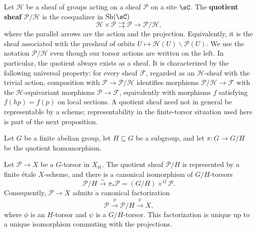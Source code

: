 Let $\mathcal{H}$ be a sheaf of groups acting on a sheaf $\mathcal{P}$ on a
site $\sC$. The \textbf{quotient sheaf} $\mathcal{P}/\mathcal{H}$ is the
coequalizer in $\operatorname{Sh}(\sC)$
\[
\mathcal{H}\times\mathcal{P}
\rightrightarrows
\mathcal{P}\longrightarrow\mathcal{P}/\mathcal{H},
\]
where the parallel arrows are the action and the projection.
Equivalently, it is the sheaf associated with the presheaf of orbits
$U\mapsto\mathcal{H}(U)\backslash\mathcal{P}(U)$. We use the notation
$\mathcal{P}/\mathcal{H}$ even though our torsor actions are written on the
left. In particular, the quotient always exists as a sheaf. It is
characterized by the following universal property:
for every sheaf $\mathcal{F}$, regarded as an $\mathcal{H}$-sheaf with the
trivial action, composition with
$\mathcal{P}\to\mathcal{P}/\mathcal{H}$ identifies morphisms
$\mathcal{P}/\mathcal{H}\to\mathcal{F}$ with the
$\mathcal{H}$-equivariant morphisms $\mathcal{P}\to\mathcal{F}$, equivalently
with morphisms $f$ satisfying $f(hp)=f(p)$ on local sections. A quotient
sheaf need not in general be representable by a scheme; representability in
the finite-torsor situation used here is part of the next proposition.

Let $G$ be a finite abelian group, let $H\subseteq G$ be a subgroup, and let
$\pi:G\to G/H$ be the quotient homomorphism.

\begin{prop}\label{prop:quotient_torsors_finite}\label{prop:quotient_torsors}
Let $\mathcal{P}\to X$ be a $G$-torsor in $X_{\text{ét}}$. The quotient sheaf
$\mathcal{P}/H$ is represented by a finite étale $X$-scheme, and there is a
canonical isomorphism of $G/H$-torsors
\[
\mathcal{P}/H \xrightarrow{\sim}
\pi_*\mathcal{P}=(G/H)\times^G\mathcal{P}.
\]
Consequently, $\mathcal{P}\to X$ admits a canonical factorization
\[
\mathcal{P}\xrightarrow{\phi}\mathcal{P}/H\xrightarrow{\psi}X,
\]
where $\phi$ is an $H$-torsor and $\psi$ is a $G/H$-torsor. This
factorization is unique up to a unique isomorphism commuting with the
projections.
\end{prop}

